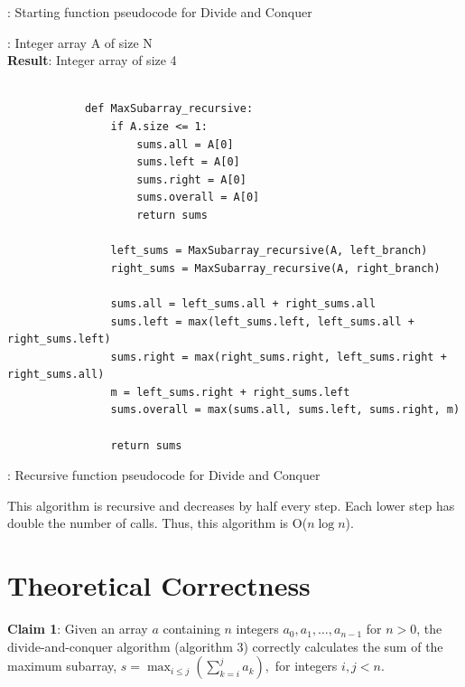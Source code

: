 \documentclass[a4paper,10pt]{article}
\begin{document}
			\begin{center}
			: Starting function pseudocode for Divide and Conquer
			\end{center}

			\vspace{1em}
			
			: Integer array A of size N \\
			{\bf Result}: Integer array of size 4

			\begin{minipage}[!h]{6in}
			\begin{verbatim}

			def MaxSubarray_recursive:
			    if A.size <= 1:
			        sums.all = A[0]
			        sums.left = A[0]
			        sums.right = A[0]
			        sums.overall = A[0]
			        return sums

			    left_sums = MaxSubarray_recursive(A, left_branch)
			    right_sums = MaxSubarray_recursive(A, right_branch)

			    sums.all = left_sums.all + right_sums.all
			    sums.left = max(left_sums.left, left_sums.all + right_sums.left)
			    sums.right = max(right_sums.right, left_sums.right + right_sums.all)
			    m = left_sums.right + right_sums.left
			    sums.overall = max(sums.all, sums.left, sums.right, m)

			    return sums
			\end{verbatim}
			\end{minipage}

			\begin{center}
			: Recursive function pseudocode for Divide and Conquer
			\end{center}

			\vspace{1em}

			\noindent This algorithm is recursive and decreases by half every step. Each lower step has double the number of calls. Thus, this algorithm is O($n \log n$).


	\newpage
	\section{Theoretical Correctness}

		{\bf Claim 1}: Given an array $a$ containing $n$ integers $a_0, a_1, \dots, a_{n-1}$ for $n > 0$, the divide-and-conquer algorithm (algorithm 3) correctly calculates the sum of the maximum subarray, $\displaystyle s = \max_{i\leq{j}} \left(\sum_{k=i}^j a_k\right),$ for integers $i,j<n$.
\end{document}

